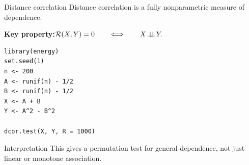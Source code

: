 \documentclass[dvipsnames,aspectratio=169,handout]{beamer}
\begin{document}
%
%
%
%

\begin{frame}[fragile]{Distance correlation}
Distance correlation is a fully nonparametric measure of dependence.

\begin{block}{}
\textbf{Key property:}\qquad $
\mathcal R(X,Y)=0
\qquad\Longleftrightarrow\qquad
X\mbox{\,$\perp\!\!\!\perp$\,} Y.
$\\[2mm]
\end{block}

\begin{lstlisting}
library(energy)
set.seed(1)
n <- 200
A <- runif(n) - 1/2
B <- runif(n) - 1/2
X <- A + B
Y <- A^2 - B^2

dcor.test(X, Y, R = 1000)
\end{lstlisting}

\begin{alertblock}{Interpretation}
This gives a permutation test for general dependence, not just linear or monotone association.
\end{alertblock}
\end{frame}
\end{document}
